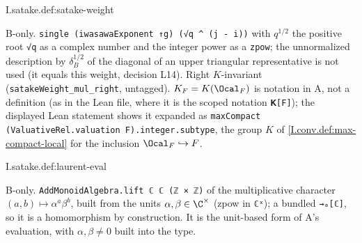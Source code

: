 \begin{definition}
\bonly
{}
\end{definition}
\begin{tfformal}{I.satake.def:satake-weight}
\begin{tffidelity}
B-only. \texttt{single (iwasawaExponent ↑g) (√q \^{} (j - i))} with $q^{1/2}$ the positive root \texttt{√q} as a complex number and the integer power as a \texttt{zpow}; the unnormalized description by $\delta_B^{1/2}$ of the diagonal of an upper triangular representative is not used (it equals this weight, decision L14). Right $K$-invariant (\texttt{satakeWeight\_mul\_right}, untagged). $K_F=K(\Ocal_F)$ is notation in A, not a definition (as in the Lean file, where it is the scoped notation \texttt{𝐊[F]}); the displayed Lean statement shows it expanded as \texttt{maxCompact (ValuativeRel.valuation F).integer.subtype}, the group $K$ of \cref{I.conv.def:max-compact-local} for the inclusion $\Ocal_F\hookrightarrow F$.
\end{tffidelity}
\end{tfformal}

\begin{definition}
\bonly
{}
\end{definition}
\begin{tfformal}{I.satake.def:laurent-eval}
\begin{tffidelity}
B-only. \texttt{AddMonoidAlgebra.lift ℂ ℂ (ℤ × ℤ)} of the multiplicative character $(a,b)\mapsto\alpha^a\beta^b$, built from the units $\alpha,\beta\in\C^\times$ (zpow in \texttt{ℂˣ}); a bundled \texttt{→ₐ[ℂ]}, so it is a homomorphism by construction. It is the unit-based form of A's evaluation, with $\alpha,\beta\ne0$ built into the type.
\end{tffidelity}
\end{tfformal}

